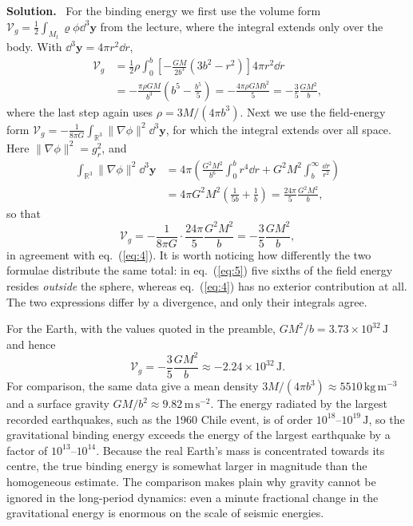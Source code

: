 \documentclass[a4paper,12pt]{paper}
\newenvironment{solution}{\par\noindent\textbf{Solution.}\ }{\par\medskip}
\begin{document}
\begin{solution}
For the binding energy we first use the volume form $\mathcal{V}_{g}=\frac{1}{2}\int_{M_{t}}\varrho\phi\dd^{3}\mathbf{y}$
from the lecture, where the integral extends only over the body. With $\dd^{3}\mathbf{y}=4\pi r^{2}\dd r$,
\begin{equation}
\begin{split}
\mathcal{V}_{g}&=\frac{1}{2}\rho\int_{0}^{b}\left[-\frac{GM}{2b^{3}}\left(3b^{2}-r^{2}\right)\right]4\pi r^{2}\dd r\\
&=-\frac{\pi\rho GM}{b^{3}}\left(b^{5}-\frac{b^{5}}{5}\right)=-\frac{4\pi\rho GMb^{2}}{5}=-\frac{3}{5}\frac{GM^{2}}{b},
\end{split}
\label{eq:4}
\end{equation}
where the last step again uses $\rho=3M/(4\pi b^{3})$. Next we use the field-energy form
$\mathcal{V}_{g}=-\frac{1}{8\pi G}\int_{\mathbb{R}^{3}}\|\nabla\phi\|^{2}\dd^{3}\mathbf{y}$, for which
the integral extends over all space. Here $\|\nabla\phi\|^{2}=g_{r}^{2}$, and
\begin{equation}
\begin{split}
\int_{\mathbb{R}^{3}}\|\nabla\phi\|^{2}\dd^{3}\mathbf{y}
&=4\pi\left(\frac{G^{2}M^{2}}{b^{6}}\int_{0}^{b}r^{4}\dd r+G^{2}M^{2}\int_{b}^{\infty}\frac{\dd r}{r^{2}}\right)\\
&=4\pi G^{2}M^{2}\left(\frac{1}{5b}+\frac{1}{b}\right)=\frac{24\pi}{5}\frac{G^{2}M^{2}}{b},
\end{split}
\label{eq:5}
\end{equation}
so that
\begin{equation}
\mathcal{V}_{g}=-\frac{1}{8\pi G}\cdot\frac{24\pi}{5}\frac{G^{2}M^{2}}{b}=-\frac{3}{5}\frac{GM^{2}}{b},
\label{eq:6}
\end{equation}
in agreement with eq.~(\ref{eq:4}). It is worth noticing how differently the two formulae distribute
the same total: in eq.~(\ref{eq:5}) five sixths of the field energy resides \emph{outside} the sphere,
whereas eq.~(\ref{eq:4}) has no exterior contribution at all. The two expressions differ by a
divergence, and only their integrals agree.

For the Earth, with the values quoted in the preamble, $GM^{2}/b=3.73\times10^{32}\,\mathrm{J}$ and hence
\begin{equation}
\mathcal{V}_{g}=-\frac{3}{5}\frac{GM^{2}}{b}\approx-2.24\times10^{32}\,\mathrm{J}.
\label{eq:7}
\end{equation}
For comparison, the same data give a mean density $3M/(4\pi b^{3})\approx5510\,\mathrm{kg\,m^{-3}}$ and a
surface gravity $GM/b^{2}\approx9.82\,\mathrm{m\,s^{-2}}$. The energy radiated by the largest recorded
earthquakes, such as the 1960 Chile event, is of order $10^{18}$--$10^{19}\,\mathrm{J}$, so the
gravitational binding energy exceeds the energy of the largest earthquake by a factor of
$10^{13}$--$10^{14}$. Because the real Earth's mass is concentrated towards its centre, the true
binding energy is somewhat larger in magnitude than the homogeneous estimate. The comparison makes
plain why gravity cannot be ignored in the long-period dynamics: even a minute fractional change in
the gravitational energy is enormous on the scale of seismic energies.
\end{solution}
\end{document}
